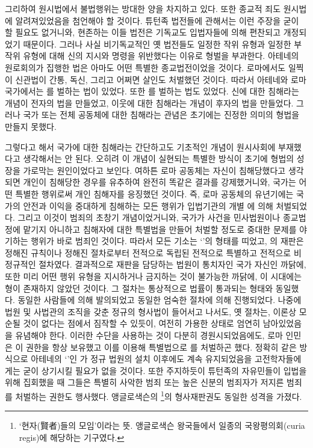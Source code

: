 그리하여 원시법에서 불법행위는 방대한 양을 차지하고 있다.
또한 종교적 죄도 원시법에 알려져있었음을 첨언해야 할 것이다.
튜턴족 법전들에 관해서는 이런 주장을 굳이 할 필요도 없거니와,
현존하는 이들 법전은 기독교도 입법자들에 의해
편찬되고 개정되었기 때문이다.
그러나 사실 비기독교적인 옛 법전들도
일정한 작위 유형과 일정한 부작위 유형에 대해
신의 지시와 명령을 위반했다는 이유로 형벌을 부과한다.
아테네의  원로회의가 집행한 법은
아마도 어떤 특별한 종교법전이었을 것이다.
로마에서도 일찍이
신관법이
간통, 독신, 그리고 어쩌면 살인도
처벌했던 것이다.
따라서 아테네와 로마 국가에서는 를 벌하는 법이 있었다.
또한 를 벌하는 법도 있었다.
신에 대한 침해라는 개념이 전자의 법을 만들었고,
이웃에 대한 침해라는 개념이 후자의 법을 만들었다.
그러나 국가 또는 전체 공동체에 대한 침해라는 관념은
초기에는 진정한 의미의 형법을 만들지 못했다.

그렇다고 해서
국가에 대한 침해라는 간단하고도 기초적인 개념이 원시사회에
부재했다고 생각해서는 안 된다.
오히려
이 개념이 실현되는 특별한 방식이
초기에 형법의 성장을 가로막는 원인이었다고 보인다.
여하튼
로마 공동체는 자신이 침해당했다고 생각되면
개인이 침해당한 경우를 유추하여
완전히 똑같은 결과를 강제했거니와,
국가는 어떤 특별한 행위로써 개인 침해자를 응징했던 것이다.
즉, 로마 공동체의 유년기에는
국가의 안전과 이익을 중대하게 침해하는 모든 행위가
입법기관의 개별 에 의해 처벌되었다.
그리고 이것이 범죄의 초창기 개념이었거니와,
국가가 사건을 민사법원이나 종교법정에 맡기지 아니하고
침해자에 대한 특별법을 만들어 처벌할 정도로
중대한 문제를 야기하는 행위가
바로 범죄인 것이다.
따라서 모든 기소는
`'의
형태를 띠었고,
의 재판은
정해진 규칙이나 정해진 절차로부터 전적으로 독립된
전적으로 특별하고 전적으로 비정규적인 절차였다.
결과적으로
재판을 담당하는 법원이 통치자인 국가 자신인 까닭에,
또한
미리 어떤 행위 유형을 지시하거나 금지하는 것이 불가능한 까닭에,
이 시대에는 형이 존재하지 않았던 것이다.
그 절차는 통상적으로 법률이 통과되는 형태와 동일했다.
동일한 사람들에 의해 발의되었고
동일한 엄숙한 절차에 의해 진행되었다.
나중에 법원 및 사법관의 조직을 갖춘 정규의 형사법이
들어서고 나서도,
옛 절차는,
이론상 모순될 것이 없다는 점에서 짐작할 수 있듯이,
여전히
가용한 상태로
엄연히
남아있었음을 유념해야 한다.
이러한 수단을 사용하는 것이 다분히 경원시되었음에도,
로마 인민은
이 권한을 항상 보유했고 이를 이용해
특별법으로 를 처벌하곤 했다.
정확히 같은 방식으로
아테네의 `'인
가
정규 법원의 설치 이후에도 계속 유지되었음을
고전학자들에게는
굳이 상기시킬 필요가 없을 것이다.
또한
주지하듯이
튜턴족의 자유민들이 입법을 위해 집회했을 때
그들은
특별히 사악한 범죄
또는
높은 신분의 범죄자가 저지른 범죄를 처벌하는 권한도 행사했다.
앵글로색슨의 \footnote{%
  `현자(賢者)들의 모임'이라는 뜻. 앵글로색슨 왕국들에서
  일종의 국왕평의회(curia regis)에 해당하는 기구였다.
}의 형사재판권도
동일한 성격을 가졌다.

